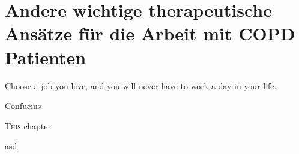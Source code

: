 \chapter{Andere wichtige therapeutische Ansätze für die Arbeit mit COPD Patienten}
\label{chapter:andere_wichtige_therapeutische_ansaetze_fuer_die_arbeit_mit_copd_patienten}
\epigraph{Choose a job you love, and you will never have to work a day in your life.}{Confucius}

\ifpdf
    \graphicspath{{4_andere_wichtige_therapeutische_ansaetze_fuer_die_arbeit_mit_copd_patienten/figures/PNG/}{4_andere_wichtige_therapeutische_ansaetze_fuer_die_arbeit_mit_copd_patienten/figures/PDF/}{4_andere_wichtige_therapeutische_ansaetze_fuer_die_arbeit_mit_copd_patienten/figures/}}
\else
    \graphicspath{{4_andere_wichtige_therapeutische_ansaetze_fuer_die_arbeit_mit_copd_patienten/figures/EPS/}{4_andere_wichtige_therapeutische_ansaetze_fuer_die_arbeit_mit_copd_patienten/figures/}}
\fi

\lettrine{T}{his} chapter 


asd